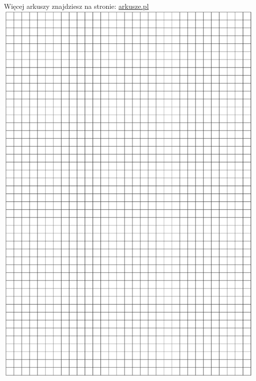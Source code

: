 \documentclass[10pt]{article}
\begin{document}
Więcej arkuszy znajdziesz na stronie: \href{http://arkusze.pl}{arkusze.pl}\\
\includegraphics[max width=\textwidth, center]{2024_11_21_4a1915d79134dda0750eg-07}
\end{document}
